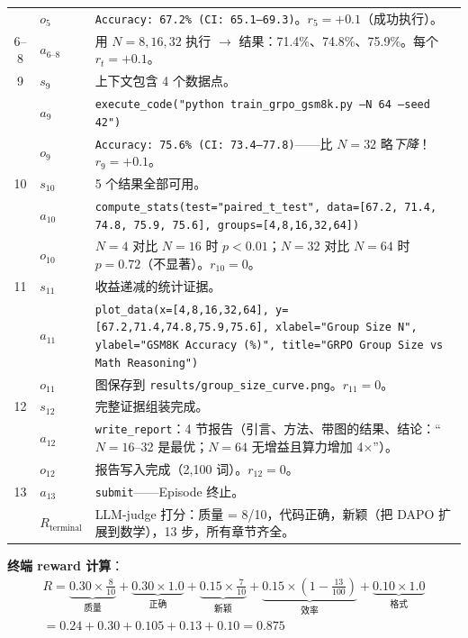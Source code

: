 \begin{examplebox}
{\begin{tabularx}{\linewidth}{@{}c Z{0.3} Z{1.7}@{}}
 & $o_5$ & \texttt{Accuracy: 67.2\% (CI: 65.1--69.3)}。$r_5 = +0.1$（成功执行）。 \\
6--8 & $a_{6\text{--}8}$ & 用 $N=8, 16, 32$ 执行 $\to$ 结果：71.4\%、74.8\%、75.9\%。每个 $r_t = +0.1$。 \\
9 & $s_9$ & 上下文包含 4 个数据点。 \\
 & $a_9$ & \texttt{execute\_code("python train\_grpo\_gsm8k.py --N 64 --seed 42")} \\
 & $o_9$ & \texttt{Accuracy: 75.6\% (CI: 73.4--77.8)}——比 $N=32$ 略\emph{下降}！$r_9 = +0.1$。 \\
10 & $s_{10}$ & 5 个结果全部可用。 \\
 & $a_{10}$ & \texttt{compute\_stats(test="paired\_t\_test", data=[67.2, 71.4, 74.8, 75.9, 75.6], groups=[4,8,16,32,64])} \\
 & $o_{10}$ & $N=4$ 对比 $N=16$ 时 $p < 0.01$；$N=32$ 对比 $N=64$ 时 $p = 0.72$（不显著）。$r_{10} = 0$。 \\
11 & $s_{11}$ & 收益递减的统计证据。 \\
 & $a_{11}$ & \texttt{plot\_data(x=[4,8,16,32,64], y=[67.2,71.4,74.8,75.9,75.6], xlabel="Group Size N", ylabel="GSM8K Accuracy (\%)", title="GRPO Group Size vs Math Reasoning")} \\
 & $o_{11}$ & 图保存到 \texttt{results/group\_size\_curve.png}。$r_{11} = 0$。 \\
12 & $s_{12}$ & 完整证据组装完成。 \\
 & $a_{12}$ & \texttt{write\_report}：4 节报告（引言、方法、带图的结果、结论：``$N=16$--32 是最优；$N=64$ 无增益且算力增加 4$\times$''）。 \\
 & $o_{12}$ & 报告写入完成（2,100 词）。$r_{12} = 0$。 \\
13 & $a_{13}$ & \texttt{submit}——Episode 终止。 \\
 & $R_{\text{terminal}}$ & LLM-judge 打分：质量 = 8/10，代码正确，新颖（把 DAPO 扩展到数学），13 步，所有章节齐全。 \\
\bottomrule
\end{tabularx}
}

\textbf{终端 reward 计算}：
\begin{multline*}
R = \underbrace{0.30 \times \tfrac{8}{10}}_{\text{质量}} + \underbrace{0.30 \times 1.0}_{\text{正确}} + \underbrace{0.15 \times \tfrac{7}{10}}_{\text{新颖}} + \underbrace{0.15 \times (1 - \tfrac{13}{100})}_{\text{效率}} + \underbrace{0.10 \times 1.0}_{\text{格式}} \\
= 0.24 + 0.30 + 0.105 + 0.13 + 0.10 = \mathbf{0.875}
\end{multline*}


\end{examplebox}
